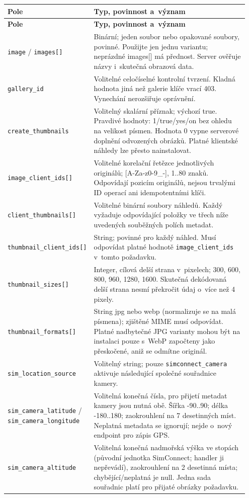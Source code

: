\documentclass[11pt,a4paper]{article}
\newcommand{\codeword}[1]{\nolinkurl{#1}}
\begin{document}
\begin{longtable}{@{}>{\RaggedRight\arraybackslash}p{0.28\linewidth}>{\RaggedRight\arraybackslash}p{0.67\linewidth}@{}}
\toprule
\textbf{Pole} & \textbf{Typ, povinnost a~význam} \\
\midrule
\endfirsthead
\toprule
\textbf{Pole} & \textbf{Typ, povinnost a~význam} \\
\midrule
\endhead
\bottomrule
\endfoot
\codeword{image} / \codeword{images[]} & Binární; jeden soubor nebo opakované soubory,
povinné. Použijte jen jednu variantu; neprázdné images[] má přednost. Server ověřuje názvy
i~skutečná obrazová data. \\
\codeword{gallery_id} & Volitelné celočíselné kontrolní tvrzení. Kladná hodnota jiná než
galerie klíče vrací 403. Vynechání nerozšiřuje oprávnění. \\
\codeword{create_thumbnails} & Volitelný skalární příznak; výchozí true. Pravdivé hodnoty:
1/true/yes/on bez ohledu na velikost písmen. Hodnota 0 vypne serverové doplnění odvozených
obrázků. Platné klientské náhledy lze přesto nainstalovat. \\
\codeword{image_client_ids[]} & Volitelné korelační řetězce jednotlivých originálů;
[A-Za-z0-9\_-], 1..80 znaků. Odpovídají pozicím originálů, nejsou trvalými ID operací ani
idempotentními klíči. \\
\codeword{client_thumbnails[]} & Volitelné binární soubory náhledů. Každý vyžaduje
odpovídající položky ve třech níže uvedených souběžných polích metadat. \\
\codeword{thumbnail_client_ids[]} & String; povinné pro každý náhled. Musí odpovídat platné
hodnotě \codeword{image_client_ids} v~tomto požadavku. \\
\codeword{thumbnail_sizes[]} & Integer, cílová delší strana v~pixelech; 300, 600, 800, 960,
1280, 1600. Skutečná dekódovaná delší strana nesmí překročit údaj o~více než 4 pixely. \\
\codeword{thumbnail_formats[]} & String jpg nebo webp (normalizuje se na malá písmena);
zjištěné MIME musí odpovídat. Platné nadbytečné JPG varianty mohou být na instalaci pouze
s~WebP započteny jako přeskočené, aniž se odmítne originál. \\
\codeword{sim_location_source} & Volitelný string; pouze \codeword{simconnect_camera}
aktivuje následující společné souřadnice kamery. \\
\codeword{sim_camera_latitude} / \codeword{sim_camera_longitude} & Volitelná konečná čísla,
pro přijetí metadat kamery jsou nutná obě. Šířka -90..90; délka -180..180; zaokrouhlení na 7
desetinných míst. Neplatná metadata se ignorují; nejde o~nový endpoint pro zápis GPS. \\
\codeword{sim_camera_altitude} & Volitelná konečná nadmořská výška ve stopách (původní
jednotka SimConnect; handler ji nepřevádí), zaokrouhlení na 2 desetinná místa;
chybějící/neplatná je null. Jedna sada souřadnic platí pro přijaté obrázky požadavku. \\
\end{longtable}
\end{document}
